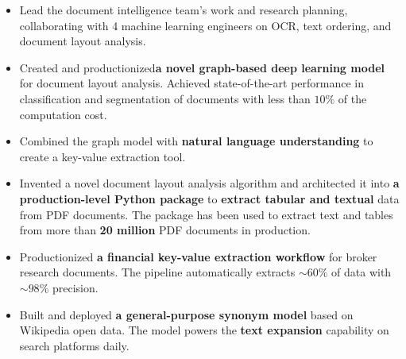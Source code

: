 \documentclass[letterpaper,11pt,oneside]{article}
\begin{document}
 \begin{flushleft}
 \begin{small}
 \begin{itemize}[leftmargin=*]
 \item Lead the document intelligence team's work and research planning, collaborating with 4 machine learning engineers on OCR, text ordering, and document layout analysis.
 \item Created and productionized\textbf{a novel graph-based deep learning model} for document layout analysis. Achieved state-of-the-art performance in classification and segmentation of documents with less than $10\%$ of the computation cost. 
 \item Combined the graph model with \textbf{natural language understanding} to create a key-value extraction tool. 
 \item Invented a novel document layout analysis algorithm and architected it into \textbf{a production-level Python package} to \textbf{extract tabular and textual} data from PDF documents. The package has been used to extract text and tables from more than \textbf{20 million} PDF documents in production.
 \item Productionized  \textbf{a financial key-value extraction workflow} for broker research documents. The pipeline automatically extracts $\sim60\%$ of data with $\sim98\%$ precision.
 \item Built and deployed \textbf{a general-purpose synonym model} based on Wikipedia open data. The model powers the \textbf{text expansion} capability on search platforms daily.
 \end{itemize}
 \end{small}
 \end{flushleft}
\end{document}
